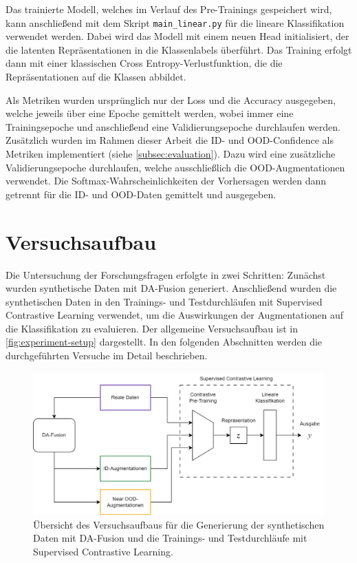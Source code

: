 Das trainierte Modell, welches im Verlauf des Pre-Trainings gespeichert wird, kann anschließend mit dem Skript \lstinline{main_linear.py} für die lineare Klassifikation verwendet werden. Dabei wird das Modell mit einem neuen Head initialisiert, der die latenten Repräsentationen in die Klassenlabels überführt. Das Training erfolgt dann mit einer klassischen Cross Entropy-Verlustfunktion, die die Repräsentationen auf die Klassen abbildet.

Als Metriken wurden ursprünglich nur der Loss und die Accuracy ausgegeben, welche jeweils über eine Epoche gemittelt werden, wobei immer eine Trainingsepoche und anschließend eine Validierungsepoche durchlaufen werden. Zusätzlich wurden im Rahmen dieser Arbeit die ID- und OOD-Confidence als Metriken implementiert (siehe \autoref{subsec:evaluation}). Dazu wird eine zusätzliche Validierungsepoche durchlaufen, welche ausschließlich die OOD-Augmentationen verwendet. Die Softmax-Wahrscheinlichkeiten der Vorhersagen werden dann getrennt für die ID- und OOD-Daten gemittelt und ausgegeben.

\section{Versuchsaufbau} \label{sec:experiment-setup}

Die Untersuchung der Forschungsfragen erfolgte in zwei Schritten: Zunächst wurden synthetische Daten mit DA-Fusion generiert. Anschließend wurden die synthetischen Daten in den Trainings- und Testdurchläufen mit Supervised Contrastive Learning verwendet, um die Auswirkungen der Augmentationen auf die Klassifikation zu evaluieren. Der allgemeine Versuchsaufbau ist in \autoref{fig:experiment-setup} dargestellt. In den folgenden Abschnitten werden die durchgeführten Versuche im Detail beschrieben.

\begin{figure}
	\centering
	\includegraphics[width=\textwidth]{figure_flowchart.png}
	\caption{Übersicht des Versuchsaufbaus für die Generierung der synthetischen Daten mit DA-Fusion und die Trainings- und Testdurchläufe mit Supervised Contrastive Learning.}
	\label{fig:experiment-setup}
\end{figure}

